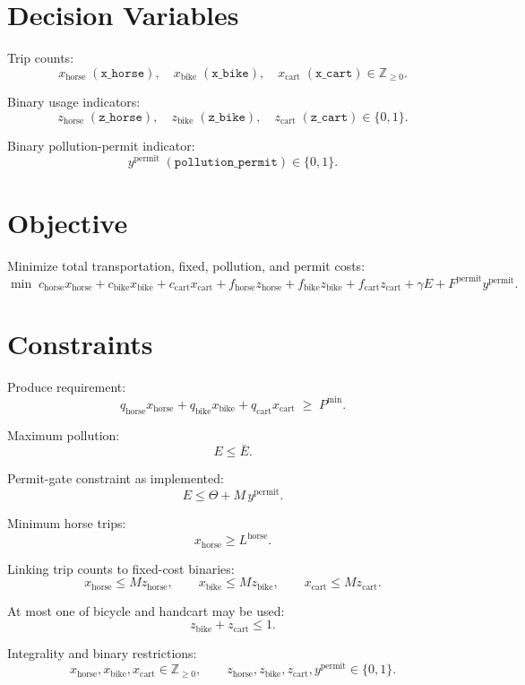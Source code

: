 \section*{Decision Variables}

Trip counts:
\[
x_{\text{horse}} \; (\texttt{x\_horse}),\quad
x_{\text{bike}} \; (\texttt{x\_bike}),\quad
x_{\text{cart}} \; (\texttt{x\_cart}) \in \mathbb{Z}_{\ge 0}.
\]

Binary usage indicators:
\[
z_{\text{horse}} \; (\texttt{z\_horse}),\quad
z_{\text{bike}} \; (\texttt{z\_bike}),\quad
z_{\text{cart}} \; (\texttt{z\_cart}) \in \{0,1\}.
\]

Binary pollution-permit indicator:
\[
y^{\text{permit}} \; (\texttt{pollution\_permit}) \in \{0,1\}.
\]

\section*{Objective}

Minimize total transportation, fixed, pollution, and permit costs:
\[
\min \;
c_{\text{horse}}x_{\text{horse}}
+ c_{\text{bike}}x_{\text{bike}}
+ c_{\text{cart}}x_{\text{cart}}
+ f_{\text{horse}}z_{\text{horse}}
+ f_{\text{bike}}z_{\text{bike}}
+ f_{\text{cart}}z_{\text{cart}}
+ \gamma E
+ F^{\text{permit}} y^{\text{permit}}.
\]

\section*{Constraints}

Produce requirement:
\[
q_{\text{horse}}x_{\text{horse}}
+ q_{\text{bike}}x_{\text{bike}}
+ q_{\text{cart}}x_{\text{cart}}
\;\ge\;
P^{\min}.
\]

Maximum pollution:
\[
E \le \bar E.
\]

Permit-gate constraint as implemented:
\[
E \le \Theta + M\, y^{\text{permit}}.
\]

Minimum horse trips:
\[
x_{\text{horse}} \ge L^{\text{horse}}.
\]

Linking trip counts to fixed-cost binaries:
\[
x_{\text{horse}} \le M z_{\text{horse}},
\qquad
x_{\text{bike}} \le M z_{\text{bike}},
\qquad
x_{\text{cart}} \le M z_{\text{cart}}.
\]

At most one of bicycle and handcart may be used:
\[
z_{\text{bike}} + z_{\text{cart}} \le 1.
\]

Integrality and binary restrictions:
\[
x_{\text{horse}},x_{\text{bike}},x_{\text{cart}} \in \mathbb{Z}_{\ge 0},
\qquad
z_{\text{horse}},z_{\text{bike}},z_{\text{cart}},y^{\text{permit}} \in \{0,1\}.
\]

